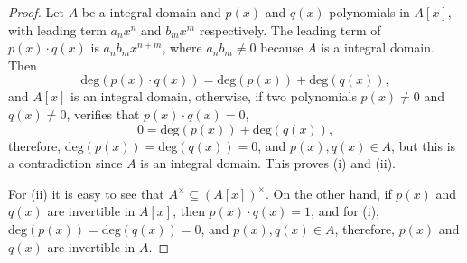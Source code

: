 \documentclass[11pt,a4paper]{article}
\begin{document}
\begin{proof}
    Let $A$ be a integral domain and $p(x)$ and $q(x)$ polynomials in $A[x],$ with leading term $a_nx^n$ and $b_mx^m$ respectively. The leading term of $p(x)\cdot q(x)$ is $a_nb_mx^{n+m}$, where $a_nb_m\neq 0$ because $A$ is a integral domain. Then 
    \[\text{deg}(p(x)\cdot q(x)) = \text{deg}(p(x))+ \text{deg}(q(x)),\]
    and $A[x]$ is an integral domain, otherwise, if two polynomials $p(x)\neq 0$ and $q(x)\neq 0$, verifies that $p(x)\cdot q(x)=0$,
    \[0 = \text{deg}(p(x))+ \text{deg}(q(x)),\]
    therefore, $\text{deg}(p(x))= \text{deg}(q(x))=0$, and $p(x),q(x)\in A$, but this is a contradiction since $A$ is an integral domain. This proves (i) and (ii). 
    
   For (ii) it is easy to see that $A^{\times}\subseteq (A[x])^{\times}.$ On the other hand, if $p(x)$ and $q(x)$ are invertible in $A[x]$, then $p(x)\cdot q(x)=1$, and for (i),  $\text{deg}(p(x))= \text{deg}(q(x))=0$, and $p(x),q(x)\in A$, therefore, $p(x)$ and $q(x)$ are invertible in $A$.
\end{proof}




\printbibliography
\end{document}
